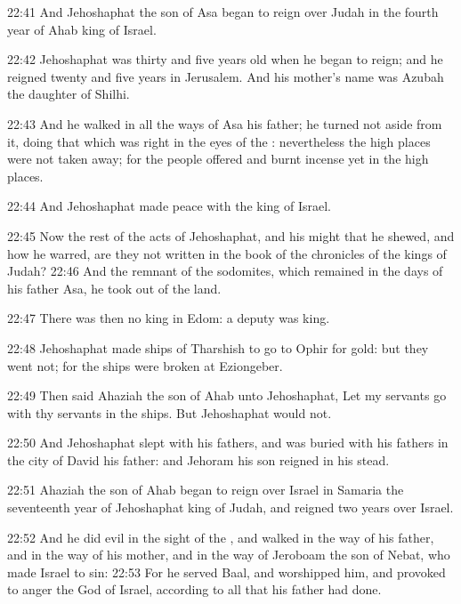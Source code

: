 22:41 And Jehoshaphat the son of Asa began to reign over Judah in the fourth year of Ahab king of Israel.

22:42 Jehoshaphat was thirty and five years old when he began to reign; and he reigned twenty and five years in Jerusalem. And his mother's name was Azubah the daughter of Shilhi.

22:43 And he walked in all the ways of Asa his father; he turned not aside from it, doing that which was right in the eyes of the \LORD: nevertheless the high places were not taken away; for the people offered and burnt incense yet in the high places.

22:44 And Jehoshaphat made peace with the king of Israel.

22:45 Now the rest of the acts of Jehoshaphat, and his might that he shewed, and how he warred, are they not written in the book of the chronicles of the kings of Judah?  22:46 And the remnant of the sodomites, which remained in the days of his father Asa, he took out of the land.

22:47 There was then no king in Edom: a deputy was king.

22:48 Jehoshaphat made ships of Tharshish to go to Ophir for gold: but they went not; for the ships were broken at Eziongeber.

22:49 Then said Ahaziah the son of Ahab unto Jehoshaphat, Let my servants go with thy servants in the ships. But Jehoshaphat would not.

22:50 And Jehoshaphat slept with his fathers, and was buried with his fathers in the city of David his father: and Jehoram his son reigned in his stead.

22:51 Ahaziah the son of Ahab began to reign over Israel in Samaria the seventeenth year of Jehoshaphat king of Judah, and reigned two years over Israel.

22:52 And he did evil in the sight of the \LORD, and walked in the way of his father, and in the way of his mother, and in the way of Jeroboam the son of Nebat, who made Israel to sin: 22:53 For he served Baal, and worshipped him, and provoked to anger the \LORD God of Israel, according to all that his father had done.

